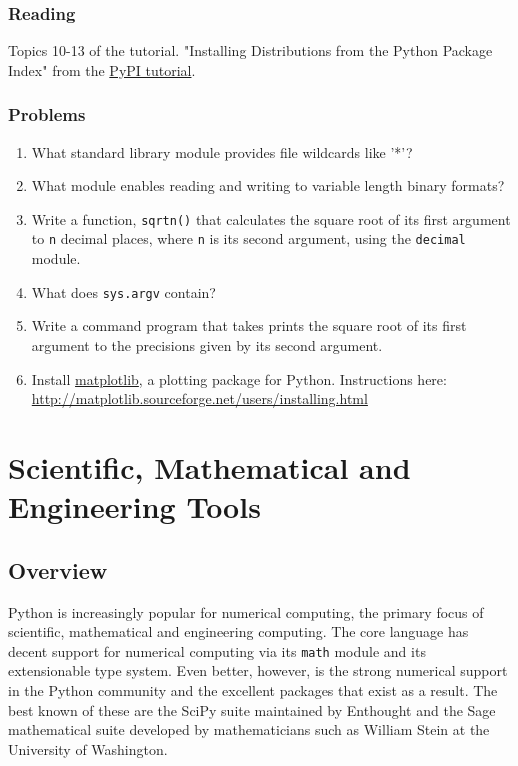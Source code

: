 \documentclass{report}
\begin{document}
\subsection{Reading}
Topics 10-13 of the tutorial. "Installing Distributions from the Python Package Index" from the \href{http://wiki.python.org/moin/CheeseShopTutorial}{PyPI tutorial}. 

\subsection{Problems}

\begin{enumerate}
	\item What standard library module provides file wildcards like '*'?
	\item What module enables reading and writing to variable length binary formats?
	\item Write a function, \verb|sqrtn()| that calculates the square root of its first argument to \verb|n| decimal places, where \verb|n| is its second argument, using the \verb|decimal| module.
	\item What does \verb|sys.argv| contain?
	\item Write a command program that takes prints the square root of its first argument to the precisions given by its second argument.
	\item Install \href{http://matplotlib.sourceforge.net/}{matplotlib}, a plotting package for Python. Instructions here: \url{http://matplotlib.sourceforge.net/users/installing.html}
\end{enumerate}

\chapter{Scientific, Mathematical and Engineering Tools}
\section{Overview}
Python is increasingly popular for numerical computing, the primary focus of scientific, mathematical and engineering computing. The core language has decent support for numerical computing via its \verb|math| module and its extensionable type system. Even better, however, is the strong numerical support in the Python community and the excellent packages that exist as a result. The best known of these are the SciPy suite maintained by Enthought and the Sage mathematical suite developed by mathematicians such as William Stein at the University of Washington.
\end{document}
